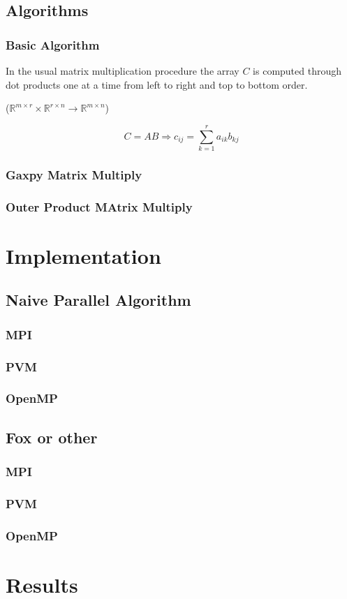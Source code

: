 \subsection{Algorithms}

\subsubsection{Basic Algorithm}

In the usual matrix multiplication procedure the array $C$ is computed
through dot products one at a time from left to right and top to
bottom order.

 ($\mathbb{R}^{m \times r} \times
\mathbb{R}^{r \times n} \to \mathbb{R}^{m \times n}$)

$$ C = AB \Longrightarrow c_{ij} = \sum_{k=1}^r a_{ik}b_{kj} $$


\subsubsection{Gaxpy Matrix Multiply}

\subsubsection{Outer Product MAtrix Multiply}


\section{Implementation}

\subsection{Naive Parallel Algorithm}

\subsubsection{MPI}
\subsubsection{PVM}
\subsubsection{OpenMP}

\subsection{Fox or other}

\subsubsection{MPI}
\subsubsection{PVM}
\subsubsection{OpenMP}

\section{Results}

